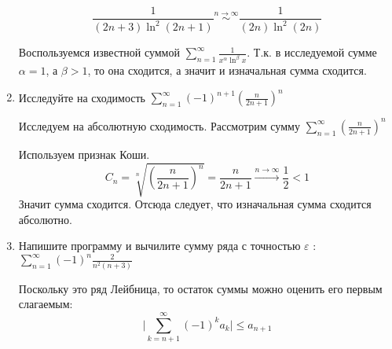 \documentclass[10pt]{article} %
\begin{document}
\begin{large}
\begin{enumerate}
\[   \frac{1}{(2n+3)\ln^2{(2n+1)}} \stackrel{n\to\infty}{\sim}  \frac{1}{(2n)\ln^2{(2n)}} \]

Воспользуемся известной суммой $  \sum\limits_{n=1}^{\infty}{ \frac{1}{x^\alpha\ln^\beta{x}} }  $. Т.к. в исследуемой сумме $\alpha = 1$, а $\beta > 1$, то она сходится, а значит и изначальная сумма сходится.

\item  Исследуйте на сходимость $ \sum\limits_{n=1}^{\infty}{ (-1)^{n+1} \left( \frac{n}{2n+1} \right)^{n} }$

Исследуем на абсолютную сходимость. Рассмотрим сумму $ \sum\limits_{n=1}^{\infty}{ \left( \frac{n}{2n+1} \right)^{n} }$

Используем признак Коши.
\[ C_{n} = \sqrt[n]{\left( \frac{n}{2n+1} \right)^{n} } = \frac{n}{2n+1} \xrightarrow{n\to\infty} \frac{1}{2} < 1 \]
Значит сумма сходится. Отсюда следует, что изначальная сумма сходится абсолютно.

\item Напишите программу и вычилите сумму ряда с точностью $\varepsilon$ : $ \sum\limits_{n=1}^{\infty}{ (-1)^{n} \frac{2}{n^2(n+3)}  }$

Поскольку это ряд Лейбница, то остаток суммы можно оценить его первым слагаемым:  
\[ \bigg\vert \sum\limits_{k=n+1}^{\infty}{ (-1)^{k} a_{k} } \bigg\vert \le a_{n+1}  \]

\end{enumerate}

\begin{verbatim}


\end{verbatim}

\end{large}  
\end{document}
